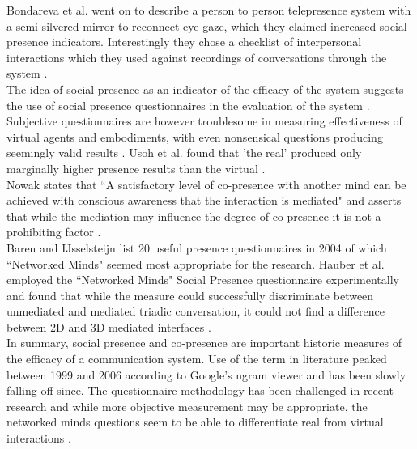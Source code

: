 			     
            Bondareva et al. went on to describe a person to person telepresence system with a semi silvered mirror to reconnect eye gaze, which they claimed increased social presence indicators. Interestingly they chose a checklist of interpersonal interactions which they used against recordings of conversations through the system \cite{Bondareva2004}.  \\
            The idea of social presence as an indicator of the efficacy of the system suggests the use of social presence questionnaires in the evaluation of the system \cite{Biocca2003}.  Subjective questionnaires are however troublesome in measuring effectiveness of virtual agents and embodiments, with even nonsensical questions producing seemingly valid results \cite{Slater2004}. Usoh et al. found that 'the real' produced only marginally higher presence results than the virtual \cite{Usoh2000a}.\\
            Nowak states that ``A satisfactory level of co-presence with another mind can be achieved with conscious awareness that the interaction is mediated" and asserts that while the mediation may influence the degree of co-presence it is not a prohibiting factor \cite{Nowak2001}.\\ 
            Baren and IJsselsteijn \cite{Baren, Harms2004} list 20 useful presence questionnaires in 2004 of which ``Networked Minds" seemed most appropriate for the research.
            Hauber et al. employed the ``Networked Minds" Social Presence questionnaire experimentally and found that while the measure could successfully discriminate between unmediated and mediated triadic conversation, it could not find a difference between 2D and 3D mediated interfaces \cite{Hauber2005, Gunawardena1997}.
            \\In summary, social presence and co-presence are important historic measures of the efficacy of a communication system. Use of the term in literature peaked between 1999 and 2006 according to Google's ngram viewer and has been slowly falling off since. The questionnaire methodology has been challenged in recent research and while more objective measurement may be appropriate, the networked minds questions seem to be able to differentiate real from virtual interactions \cite{Harms2004}.
